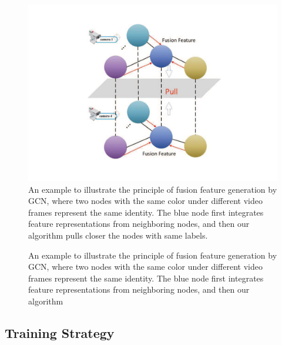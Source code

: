 \documentclass[10pt,twocolumn,letterpaper]{article}
\begin{document}
\begin{figure}[ht]
	\centering
	\includegraphics[scale=0.4]{fig/feature_fusion.pdf}
	\caption{An example to illustrate the principle of fusion feature generation by GCN, where two nodes with the same color under different video frames represent the same identity.
	The blue node first integrates feature representations from neighboring nodes, and then our algorithm pulls closer the nodes with same labels.}
	\label{fig:feature_fusion}
\end{figure}


\begin{figure}[ht]
	\centering
	\caption{An example to illustrate the principle of fusion feature generation by GCN, where two nodes with the same color under different video frames represent the same identity.
	The blue node first integrates feature representations from neighboring nodes, and then our algorithm}
\end{figure}




\subsection{Training Strategy}
\end{document}
